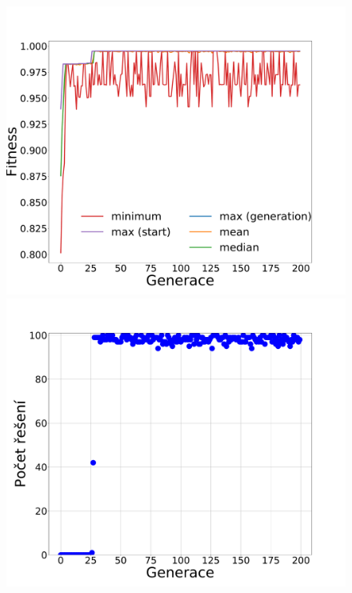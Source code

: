 \documentclass[11pt]{article}
\begin{document}
\begin{landscape}
\begin{figure}
	\centering
    \begin{minipage}[c]{0.35\textwidth}
        \centering\includegraphics[width=\textwidth]{img/m001g.pdf} 
    \end{minipage}
    \begin{minipage}[c]{0.35\textwidth}
        \centering \includegraphics[width=\textwidth]{img/m001s.pdf} 
    \end{minipage}

\end{figure}
\end{landscape}
\end{document}
